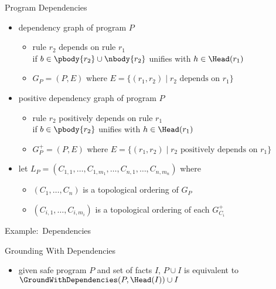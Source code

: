 \begin{frame}{Program Dependencies}
  \vfill
  \begin{itemize}
    \item \alert{dependency graph} of program \(P\)
      \begin{itemize}
        \item rule \(r_2\) \alert{depends} on rule \(r_1\)\\ if \(b\in\pbody{r_2}\cup\nbody{r_2}\) unifies with \(h\in\Head(r_1)\)
        \item \(G_P=(P,E)\) where \(E=\{ (r_1,r_2) \mid r_2 \mbox{ depends on } r_1 \}\)
      \end{itemize}
    \item \alert{positive dependency graph} of program \(P\)
      \begin{itemize}
        \item rule \(r_2\) \alert{positively depends} on rule \(r_1\)\\ if \(b\in\pbody{r_2}\) unifies with \(h\in\Head(r_1)\)
        \item \(G^+_P=(P,E)\) where \(E=\{ (r_1,r_2) \mid r_2 \mbox{ positively depends on } r_1 \}\)
      \end{itemize}
    \item let \(L_P = (C_{1,1},\dots,C_{1,m_1},\dots,C_{n,1},\dots,C_{n,m_n})\) where
      \begin{itemize}
        \item \((C_1,\dots,C_n)\) is a topological ordering of \(G_P\)
        \item \((C_{i,1},\dots,C_{i,m_i})\) is a topological ordering of each \(G^+_{C_i}\)
      \end{itemize}
  \end{itemize}
\end{frame}

\begin{frame}{\mbox{Example: Dependencies}}
  \begin{center}
  \DepGraph
  \end{center}
\end{frame}

\begin{frame}{Grounding With Dependencies}
  \vfill
  \begin{itemize}
    \item given safe program \(P\) and set of facts \(I\), \(P \cup I\) is equivalent to \(\GroundWithDependencies(P,\Head(I)) \cup I\)
  \end{itemize}
\end{frame}

